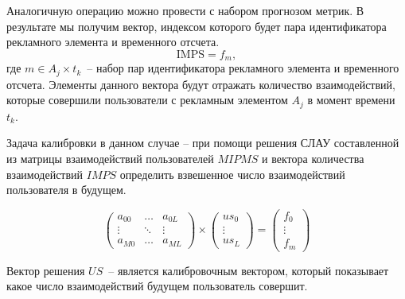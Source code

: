     Аналогичную операцию можно провести с набором прогнозом метрик. В результате мы получим вектор, индексом которого будет
    пара идентификатора рекламного элемента и временного отсчета.
    \begin{equation}
        \text{IMPS} = f_{m},
    \end{equation} где $m \in {A_j \times t_k}$~-- набор пар идентификатора рекламного элемента и временного отсчета. 
    Элементы данного вектора будут отражать количество взаимодействий, которые совершили пользователи с рекламным 
    элементом $A_j$ в момент времени $t_k$.\
    

    Задача калибровки в данном случае -- при помощи решения СЛАУ составленной из матрицы взаимодействий пользователей
    $MIPMS$ и вектора количества взаимодействий $IMPS$ определить взвешенное число взаимодействий пользователя 
    в будущем.

    \begin{equation}
        \left(
            \begin{array}{ccc}
                a_{00} & \dots & a_{0L}  \\
                \vdots & \ddots & \vdots\\
                a_{M0} & \dots & a_{ML}
            \end{array}
        \right) \times
        \left(
            \begin{array}{ccc}
                us_0 \\
                \vdots \\
                us_L
            \end{array}
        \right) = 
        \left(
            \begin{array}{ccc}
                f_0 \\
                \vdots \\
                f_m
            \end{array}
        \right)
    \end{equation}

    Вектор решения $US$~-- является калибровочным вектором, который показывает какое число взаимодействий будущем
    пользователь совершит.


